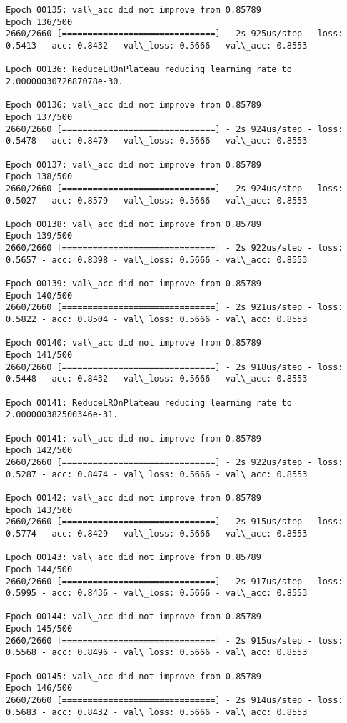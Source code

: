 \documentclass[11pt]{article}
\begin{document}
\begin{Verbatim}[commandchars=\\\{\}]
Epoch 00135: val\_acc did not improve from 0.85789
Epoch 136/500
2660/2660 [==============================] - 2s 925us/step - loss: 0.5413 - acc: 0.8432 - val\_loss: 0.5666 - val\_acc: 0.8553

Epoch 00136: ReduceLROnPlateau reducing learning rate to 2.0000003072687078e-30.

Epoch 00136: val\_acc did not improve from 0.85789
Epoch 137/500
2660/2660 [==============================] - 2s 924us/step - loss: 0.5478 - acc: 0.8470 - val\_loss: 0.5666 - val\_acc: 0.8553

Epoch 00137: val\_acc did not improve from 0.85789
Epoch 138/500
2660/2660 [==============================] - 2s 924us/step - loss: 0.5027 - acc: 0.8579 - val\_loss: 0.5666 - val\_acc: 0.8553

Epoch 00138: val\_acc did not improve from 0.85789
Epoch 139/500
2660/2660 [==============================] - 2s 922us/step - loss: 0.5657 - acc: 0.8398 - val\_loss: 0.5666 - val\_acc: 0.8553

Epoch 00139: val\_acc did not improve from 0.85789
Epoch 140/500
2660/2660 [==============================] - 2s 921us/step - loss: 0.5822 - acc: 0.8504 - val\_loss: 0.5666 - val\_acc: 0.8553

Epoch 00140: val\_acc did not improve from 0.85789
Epoch 141/500
2660/2660 [==============================] - 2s 918us/step - loss: 0.5448 - acc: 0.8432 - val\_loss: 0.5666 - val\_acc: 0.8553

Epoch 00141: ReduceLROnPlateau reducing learning rate to 2.000000382500346e-31.

Epoch 00141: val\_acc did not improve from 0.85789
Epoch 142/500
2660/2660 [==============================] - 2s 922us/step - loss: 0.5287 - acc: 0.8474 - val\_loss: 0.5666 - val\_acc: 0.8553

Epoch 00142: val\_acc did not improve from 0.85789
Epoch 143/500
2660/2660 [==============================] - 2s 915us/step - loss: 0.5774 - acc: 0.8429 - val\_loss: 0.5666 - val\_acc: 0.8553

Epoch 00143: val\_acc did not improve from 0.85789
Epoch 144/500
2660/2660 [==============================] - 2s 917us/step - loss: 0.5995 - acc: 0.8436 - val\_loss: 0.5666 - val\_acc: 0.8553

Epoch 00144: val\_acc did not improve from 0.85789
Epoch 145/500
2660/2660 [==============================] - 2s 915us/step - loss: 0.5568 - acc: 0.8496 - val\_loss: 0.5666 - val\_acc: 0.8553

Epoch 00145: val\_acc did not improve from 0.85789
Epoch 146/500
2660/2660 [==============================] - 2s 914us/step - loss: 0.5683 - acc: 0.8432 - val\_loss: 0.5666 - val\_acc: 0.8553


\end{Verbatim}
\end{document}
